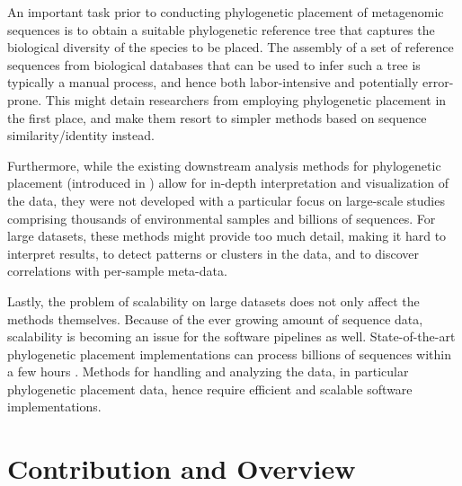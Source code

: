 An important task prior to conducting phylogenetic placement of metagenomic sequences is to obtain a suitable
phylogenetic reference tree that captures the biological diversity of the species to be placed.
The assembly of a set of reference sequences from biological databases that can be used to infer such a tree
is typically a manual process, and hence both labor-intensive and potentially error-prone.
This might detain researchers from employing phylogenetic placement in the first place,
and make them resort to simpler methods based on sequence similarity/identity instead.

Furthermore, while the existing downstream analysis methods for phylogenetic placement
(introduced in )
allow for in-depth interpretation and visualization of the data,
they were not developed with a particular focus on large-scale studies
comprising thousands of environmental samples and billions of sequences.
For large datasets, these methods might provide too much detail,
making it hard to interpret results, to detect patterns or clusters in the data,
and to discover correlations with per-sample meta-data.

Lastly, the problem of scalability on large datasets does not only affect the methods themselves.
Because of the ever growing amount of sequence data,
scalability is becoming an issue for the software pipelines as well.
State-of-the-art phylogenetic placement implementations can process billions of sequences within a few hours \cite{Barbera2018}.
Methods for handling and analyzing the data, in particular phylogenetic placement data,
hence require efficient and scalable software implementations.



\section{Contribution and Overview}
\label{ch:Introduction:sec:ContributionOverview}

